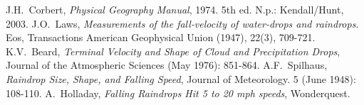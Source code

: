 \documentclass[journal]{IEEEtran}
\begin{document}

%
%
%
\begin{thebibliography}{1}

  J.H.~Corbert, \emph{Physical Geography Manual}, 1974. 5th ed. N.p.: Kendall/Hunt, 2003.
  J.O.~Laws, \emph{ Measurements of the fall‐velocity of water‐drops and raindrops}. Eos, Transactions American Geophysical Union (1947), 22(3), 709-721.
  K.V.~Beard, \emph{Terminal Velocity and Shape of Cloud and Precipitation Drops}, Journal of the Atmospheric Sciences (May 1976): 851-864.
  A.F.~Spilhaus, \emph{Raindrop Size, Shape, and Falling Speed}, Journal of Meteorology. 5 (June 1948): 108-110.
  A.~Holladay, \emph{Falling Raindrops Hit 5 to 20 mph speeds}, Wonderquest.

\end{thebibliography}
\end{document}
